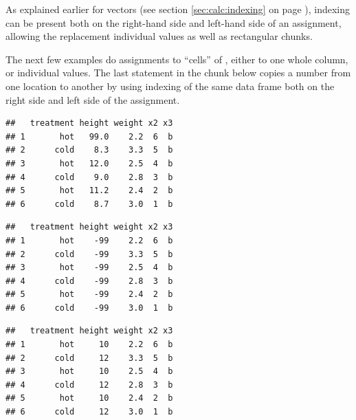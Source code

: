 \documentclass[krantz2]{krantz}\usepackage{knitr}
\begin{document}
As explained earlier for vectors (see section \ref{sec:calc:indexing} on page \pageref{sec:calc:indexing}), indexing can be present both on the right-hand side and left-hand side of an assignment, allowing the replacement individual values as well as rectangular chunks.

The next few examples do assignments to ``cells'' of , either to one whole column, or individual values. The last statement in the chunk below copies a number from one location to another by using indexing of the same data frame both on the right side and left side of the assignment.\qRoperator{[[]]}\qRoperator{[]}

\begin{knitrout}\footnotesize
{}\color{fgcolor}\begin{kframe}
\begin{alltt}
\hlstd{a.df[}\hlstd{,} \hlstd{]} \hlkwb{<-} 
\end{alltt}
\begin{verbatim}
##   treatment height weight x2 x3
## 1       hot   99.0    2.2  6  b
## 2      cold    8.3    3.3  5  b
## 3       hot   12.0    2.5  4  b
## 4      cold    9.0    2.8  3  b
## 5       hot   11.2    2.4  2  b
## 6      cold    8.7    3.0  1  b
\end{verbatim}
\begin{alltt}
\hlstd{a.df[ ,} \hlstd{]} \hlkwb{<-} \hlopt{-}
\end{alltt}
\begin{verbatim}
##   treatment height weight x2 x3
## 1       hot    -99    2.2  6  b
## 2      cold    -99    3.3  5  b
## 3       hot    -99    2.5  4  b
## 4      cold    -99    2.8  3  b
## 5       hot    -99    2.4  2  b
## 6      cold    -99    3.0  1  b
\end{verbatim}
\begin{alltt}
\hlstd{a.df[[}\hlstd{]]} \hlkwb{<-} \hlstd{(}\hlstd{,} \hlstd{)}
\end{alltt}
\begin{verbatim}
##   treatment height weight x2 x3
## 1       hot     10    2.2  6  b
## 2      cold     12    3.3  5  b
## 3       hot     10    2.5  4  b
## 4      cold     12    2.8  3  b
## 5       hot     10    2.4  2  b
## 6      cold     12    3.0  1  b
\end{verbatim}
\begin{alltt}

\end{alltt}
\end{kframe}
\end{knitrout}
\end{document}
